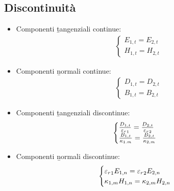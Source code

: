 \subsection{Discontinuità}
\begin{itemize}
\item Componenti \b{tangenziali continue}:
\begin{equation}\begin{split}
\begin{cases}
E_{1,t}=E_{2,t}\\
H_{1,t}=H_{2,t}
\end{cases}
\end{split}\end{equation}
\item Componenti \b{normali continue}:
\begin{equation}\begin{split}
\begin{cases}
D_{1,t}=D_{2,t}\\
B_{1,t}=B_{2,t}
\end{cases}
\end{split}\end{equation}
\item Componenti \b{tangenziali discontinue}:
\begin{equation}\begin{split}
\begin{cases}
\frac{D_{1,t}}{{\varepsilon_r}_1}=\frac{D_{2,t}}{{\varepsilon_r}_2}\\
\frac{B_{1,t}}{\kappa_{1.m}}=\frac{B_{2,t}}{\kappa_{2,m}}
\end{cases}
\end{split}\end{equation}
\item Componenti \b{normali discontinue}:
\begin{equation}\begin{split}
\begin{cases}
{\varepsilon_r}_1 E_{1,n}={\varepsilon_r}_2 E_{2,n}\\
\kappa_{1,m} H_{1,n}=\kappa_{2,m} H_{2,n}
\end{cases}
\end{split}\end{equation}
\end{itemize}

